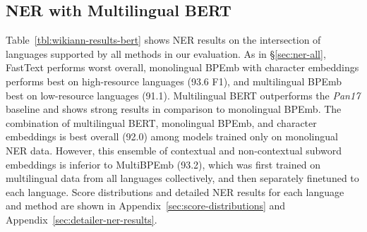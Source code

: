 \documentclass[11pt,a4paper]{article}
\newcommand\secref[1]{\S\ref{#1}}
\begin{document}
\subsection{NER with Multilingual BERT}
\label{sec:ner-bert}

Table~\ref{tbl:wikiann-results-bert} shows NER results on the intersection of languages supported by all methods in our evaluation.
As in \secref{sec:ner-all}, FastText performs worst overall, monolingual BPEmb with character embeddings performs best on high-resource languages (93.6 F1), and multilingual BPEmb best on low-resource languages (91.1).
Multilingual BERT outperforms the \emph{Pan17} baseline and shows strong results in comparison to monolingual BPEmb. 
The combination of multilingual BERT, monolingual BPEmb, and character embeddings is best overall (92.0) among models trained only on monolingual NER data.
However, this ensemble of contextual and non-contextual subword embeddings is inferior to MultiBPEmb (93.2), which was first trained on multilingual data from all languages collectively, and then separately finetuned to each language.
Score distributions and detailed NER results for each language and method are shown in Appendix~\ref{sec:score-distributions} and Appendix~\ref{sec:detailer-ner-results}.
\end{document}
